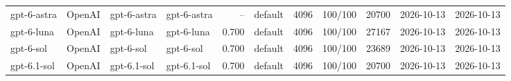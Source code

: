 \begin{table}
\begin{tabular}{llllrlrlrll}
gpt-6-astra & OpenAI & gpt-6-astra & gpt-6-astra & -- & default & 4096 & 100/100 & 20700 & 2026-10-13 & 2026-10-13 \\
gpt-6-luna & OpenAI & gpt-6-luna & gpt-6-luna & 0.700 & default & 4096 & 100/100 & 27167 & 2026-10-13 & 2026-10-13 \\
gpt-6-sol & OpenAI & gpt-6-sol & gpt-6-sol & 0.700 & default & 4096 & 100/100 & 23689 & 2026-10-13 & 2026-10-13 \\
gpt-6.1-sol & OpenAI & gpt-6.1-sol & gpt-6.1-sol & 0.700 & default & 4096 & 100/100 & 20700 & 2026-10-13 & 2026-10-13 \\
\bottomrule
\end{tabular}
\end{table}
